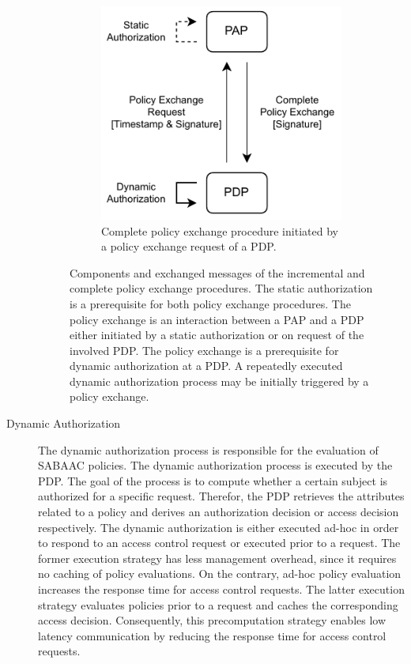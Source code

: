 \begin{description}
\begin{figure}
\begin{subfigure}[t]{0.48\linewidth}
            \includegraphics[width=\linewidth]{figures/SABAAC_protocols_authorization_dynamic_policyexchange_complete.drawio.pdf}
            \caption{Complete policy exchange procedure initiated by a policy exchange request of a PDP.}
            \label{fig:sabaac_authorization_dynamic_policyexchange_complete}
        \end{subfigure}
        \caption{Components and exchanged messages of the incremental and complete policy exchange procedures. The static authorization is a prerequisite for both  policy exchange procedures. The policy exchange is an interaction between a PAP and a PDP either initiated by a static authorization or on request of the involved PDP. The policy exchange is a prerequisite for dynamic authorization at a PDP. A repeatedly executed dynamic authorization process may be initially triggered by a policy exchange.}
        \label{fig:sabaac_authorization_dynamic_policyexchange}
    \end{figure}
    \item[Dynamic Authorization] The dynamic authorization process is responsible for the evaluation of SABAAC policies.
    The dynamic authorization process is executed by the PDP.
    The goal of the process is to compute whether a certain subject is authorized for a specific request.
    Therefor, the PDP retrieves the attributes related to a policy and derives an authorization decision or access decision respectively.
    The dynamic authorization is either executed ad-hoc in order to respond to an access control request or executed prior to a request.
    The former execution strategy has less management overhead, since it requires no caching of policy evaluations.
    On the contrary, ad-hoc policy evaluation increases the response time for access control requests.
    The latter execution strategy evaluates policies prior to a request and caches the corresponding access decision.
    Consequently, this precomputation strategy enables low latency communication by reducing the response time for access control requests.
\end{description}

